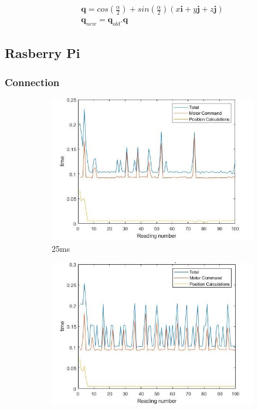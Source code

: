 \documentclass[twoside,twocolumn,12pt]{article}
\begin{document}
\begin{gather}
\textbf{q} = cos(\frac{\alpha}{2}) + sin(\frac{\alpha}{2})(x\textbf{i} + y\textbf{j} + z\textbf{j}) \nonumber \\
\textbf{q}_{new} = \textbf{q}_{old} . \textbf{q} \nonumber
\end{gather}
  
\subsection{Rasberry Pi}
\subsubsection{Connection}

\begin{figure}[t]
  \centering
  \begin{subfigure}[t]{0.325\textwidth}
    \includegraphics[width=\linewidth]{25ms_pi}
   \caption{25ms}
  \label{fig:pi25}
  \end{subfigure}
  \begin{subfigure}[t]{0.325\textwidth}
    \includegraphics[width=\linewidth]{50ms_pi}

\end{subfigure}
\end{figure}
\end{document}
